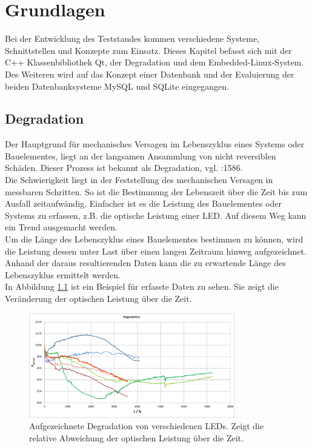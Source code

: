 \chapter{Grundlagen}
\label{chapter_Grundlagen}

Bei der Entwicklung des Teststandes kommen verschiedene Systeme, Schnittstellen und Konzepte zum Einsatz. Dieses Kapitel befasst sich mit der C++ Klassenbibliothek Qt, der Degradation und dem Embedded-Linux-System. Des Weiteren wird auf das Konzept einer Datenbank und der Evaluierung der beiden Datenbanksysteme MySQL und SQLite eingegangen.

\section{Degradation}
\label{section_Degradation}
Der Hauptgrund für mechanisches Versagen im Lebenszyklus eines Systems oder Bauelementes, liegt an der langsamen Ansammlung von nicht reversiblen Schäden. Dieser Prozess ist bekannt als Degradation, vgl. \cite{zhou2011}:1586.\\
Die Schwierigkeit liegt in der Feststellung des mechanischen Versagen in messbaren Schritten. So ist die Bestimmung der Lebenszeit über die Zeit bis zum Ausfall zeitaufwändig. Einfacher ist es die Leistung des Bauelementes oder Systems zu erfassen, z.B. die optische Leistung einer LED. Auf diesem Weg kann ein Trend ausgemacht werden.\\
Um die Länge des Lebenszyklus eines Bauelementes bestimmen zu können, wird die Leistung dessen unter Last über einen langen Zeitraum hinweg aufgezeichnet. Anhand der daraus resultierenden Daten kann die zu erwartende Länge des Lebenszyklus ermittelt werden.\\
In Abbildung \ref{figure_Degradation} ist ein Beispiel für erfasste Daten zu sehen. Sie zeigt die Veränderung der optischen Leistung über die Zeit. 

 
\begin{figure}[H]
\begin{center}
\includegraphics[width=0.8\textwidth]{img/general/Degradation.png}
\caption{Aufgezeichnete Degradation von verschiedenen LEDs. Zeigt die relative Abweichung der optischen Leistung über die Zeit.}
\label{figure_Degradation}
\end{center}
\end{figure}



